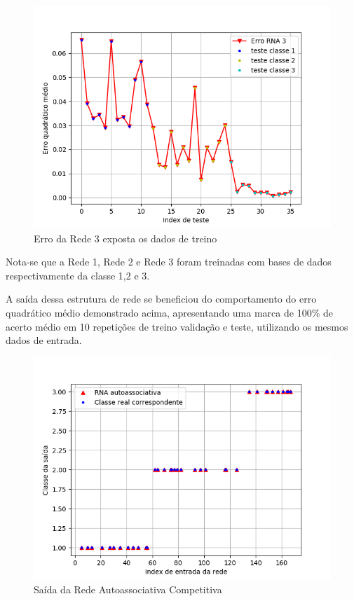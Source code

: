 \begin{figure}[H]
\centering %
\includegraphics[width=\columnwidth]{04-Figuras/Erro_classe3_auto}
\caption{Erro da Rede 3 exposta os dados de treino}
\label{figura:acuracia}
\end{figure}
Nota-se que a Rede 1, Rede 2 e Rede 3 foram treinadas com bases de dados respectivamente da classe 1,2 e 3.

A saída dessa estrutura de rede se beneficiou do comportamento do erro quadrático médio demonstrado acima, apresentando uma marca de 100\% de acerto médio em 10 repetições de treino validação e teste,  utilizando os mesmos dados de entrada.
\begin{figure}[H]
\centering %
\includegraphics[width=\columnwidth]{04-Figuras/auto_mlp_out}
\caption{Saída da Rede Autoassociativa Competitiva}
\label{figura:acuracia}
\end{figure}
